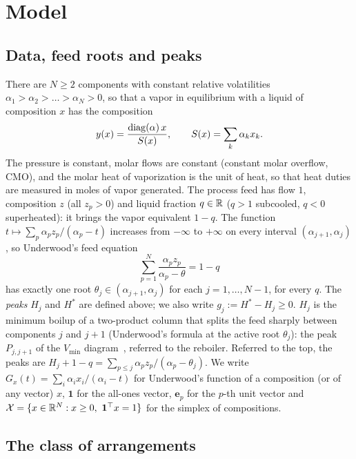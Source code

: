 \documentclass[11pt,a4paper]{report}
\newcommand{\cX}{\mathcal X}
\newcommand{\one}{\mathbf 1}
\newcommand{\bfe}{\mathbf e}
\newcommand{\Hs}{H^{*}}
\begin{document}
\section{Model}\label{sec:model}

\subsection{Data, feed roots and peaks}\label{sec:data}

There are \(N\ge2\) components with constant relative volatilities \(\alpha_1>\alpha_2>\dots>\alpha_N>0\), so that a vapor in
equilibrium with a liquid of composition \(x\) has the composition
\[y(x)=\frac{\operatorname{diag}(\alpha)\,x}{S(x)},\qquad S(x)=\sum_k\alpha_kx_k .\]
The pressure is constant, molar flows are constant (constant molar overflow, CMO), and the molar heat of vaporization is
the unit of heat, so that heat duties are measured in moles of vapor generated. The process feed has flow \(1\), composition
\(z\) (all \(z_p>0\)) and liquid fraction \(q\in\mathbb{R}\) (\(q>1\) subcooled, \(q<0\) superheated): it brings the vapor
equivalent \(1-q\). The function \(t\mapsto\sum_p\alpha_pz_p/(\alpha_p-t)\) increases from \(-\infty\) to \(+\infty\) on every
interval \((\alpha_{j+1},\alpha_j)\), so Underwood's feed equation
\begin{equation}\label{eq:feedroots}
\sum_{p=1}^N\frac{\alpha_pz_p}{\alpha_p-\theta}=1-q
\end{equation}
has exactly one root \(\theta_j\in(\alpha_{j+1},\alpha_j)\) for each \(j=1,\dots,N-1\), for every \(q\). The \emph{peaks}
\(H_j\) and \(\Hs\) are defined above; we also write \(g_j:=\Hs-H_j\ge0\). \(H_j\) is the minimum boilup of a two-product column
that splits the feed sharply between components \(j\) and \(j+1\) (Underwood's formula at the active root \(\theta_j\)): the
peak \(P_{j,j+1}\) of the \(V_{\min}\) diagram~\autocite{HS1}, referred to the reboiler. Referred to the top, the peaks are
\(H_j+1-q=\sum_{p\le j}\alpha_pz_p/(\alpha_p-\theta_j)\). We write \(G_x(t)=\sum_i\alpha_ix_i/(\alpha_i-t)\) for Underwood's
function of a composition (or of any vector) \(x\), \(\one\) for the all-ones vector, \(\bfe_p\) for the \(p\)-th unit vector
and \(\cX=\{x\in\R^N:x\ge0,\ \one^\top x=1\}\) for the simplex of compositions.

\subsection{The class of arrangements}\label{sec:classA}
\end{document}
